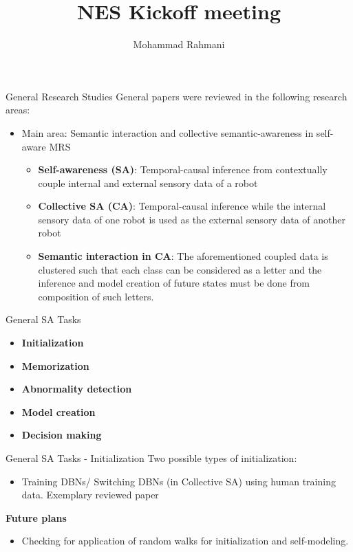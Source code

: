 \documentclass[unknownkeysallowed]{beamer}
\title{NES Kickoff meeting}
\author{Mohammad Rahmani}
\institute{DECIDE Graduate School}
\begin{document}
\begin{frame}
	\maketitle
\end{frame}


\begin{frame}{General Research Studies}
	General papers were reviewed in the following research areas:
	\begin{itemize}
		\item Main area: Semantic interaction and collective semantic-awareness in self-aware MRS
			\begin{itemize}
				\item \textbf{Self-awareness (SA)}: Temporal-causal inference from contextually couple internal and external sensory data of a robot
				\item \textbf{Collective SA (CA)}: Temporal-causal inference while the internal sensory data of one robot is used as the external sensory data of another robot
				\item \textbf{Semantic interaction in CA}: The aforementioned coupled data is clustered such that each class can be considered as a letter and the inference and model creation of future states must be done from composition of such letters.
			\end{itemize}
	\end{itemize}
\end{frame}

\begin{frame}{General SA Tasks}
	\begin{itemize}
		\item \textbf{Initialization}
		\item \textbf{Memorization}
		\item \textbf{Abnormality detection}
		\item \textbf{Model creation}
		\item \textbf{Decision making}
	\end{itemize}
\end{frame}

\begin{frame}{General SA Tasks - Initialization}
	Two possible types of initialization:
	\begin{itemize}
		\item Training DBNs/ Switching DBNs (in Collective SA) using human training data. Exemplary reviewed paper 
	\end{itemize}
	\textbf{Future plans}
	\begin{itemize}
		\item Checking for application of random walks for initialization and self-modeling.
	\end{itemize}
\end{frame}
\end{document}
